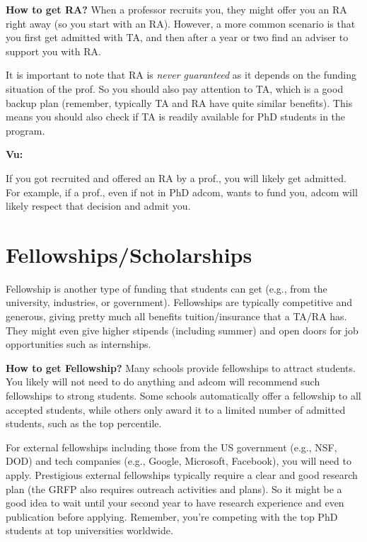 \documentclass[oneside,11pt,dvipsnames]{book}
\newenvironment{commentbox}[1][]{
  \small
  \begin{mybox}
    {\small \textbf{#1}}
  }{
  \end{mybox}
}
\begin{document}
\textbf{How to get RA?} When a professor recruits you, they might offer you an RA right away (so you start with an RA).  However, a more common scenario is that you first get admitted with TA, and then after a year or two find an adviser to support you with RA.

It is important to note that RA is \emph{never guaranteed} as it depends on the funding situation of the prof. So you should also pay attention to TA, which is a good backup plan (remember, typically TA and RA have quite similar benefits). This means you should also check if TA is readily available for PhD students in the program.


\begin{commentbox}[Vu:]
  If you got recruited and offered an RA by a prof., you will likely get admitted.  For example, if a prof., even if not in PhD adcom, wants to fund you, adcom will likely respect that decision and admit you.
\end{commentbox}

\section{Fellowships/Scholarships}\label{sec:fellowships}

Fellowship is another type of funding that students can get (e.g., from the university, industries, or government).
Fellowships are typically competitive and generous, giving pretty much all benefits tuition/insurance that a TA/RA has.  They might even give higher stipends (including summer) and open doors for job opportunities such as internships.

\textbf{How to get Fellowship?}   Many schools provide fellowships to attract students. You likely will not need to do anything and adcom will recommend such fellowships to strong students. Some schools automatically offer a fellowship to all accepted students, while others only award it to a limited number of admitted students, such as the top percentile.

For external fellowships including those from the US government (e.g., NSF, DOD) and tech companies (e.g., Google, Microsoft, Facebook), you will need to apply.  %
Prestigious external fellowships typically require a clear and good research plan (the GRFP also requires outreach activities and plans). So it might be a good idea to wait until your second year to have research experience and even publication before applying. Remember, you're competing with the top PhD students at top universities worldwide.
\end{document}
